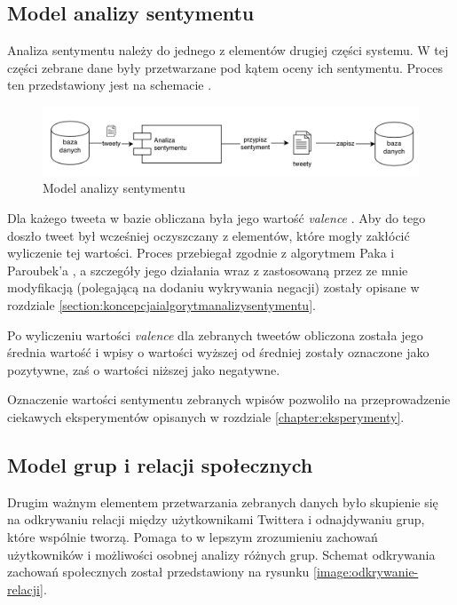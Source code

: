 \subsection{Model analizy sentymentu}
\label{subsection:modelanalizysentymentu}

Analiza sentymentu należy do jednego z elementów drugiej części systemu.
W tej części zebrane dane były przetwarzane pod kątem
oceny ich sentymentu. Proces ten przedstawiony jest na schemacie
.

\begin{figure}[ht!]
\centering
\includegraphics[width=160mm]{img/model-analizy-sentymentu.png}
\caption{Model analizy sentymentu}
\label{image:model-analizy-sentymentu}
\end{figure}


Dla każego tweeta w bazie obliczana była jego wartość \textit{valence}
.
Aby do tego doszło tweet był wcześniej oczyszczany z elementów, które mogły
zakłócić wyliczenie tej wartości. Proces przebiegał zgodnie z algorytmem Paka i
Paroubek'a , a szczegóły jego działania wraz
z zastosowaną przez ze mnie modyfikacją (polegającą na dodaniu wykrywania
negacji) zostały opisane w rozdziale
\ref{section:koncepcjaialgorytmanalizysentymentu}.

Po wyliczeniu wartości \textit{valence} dla zebranych tweetów obliczona została
jego średnia wartość i wpisy o wartości wyższej od średniej zostały oznaczone
jako pozytywne, zaś o wartości niższej jako negatywne.

Oznaczenie wartości sentymentu zebranych wpisów pozwoliło na przeprowadzenie
ciekawych eksperymentów opisanych w rozdziale \ref{chapter:eksperymenty}.


\subsection{Model grup i relacji społecznych}
\label{subsection:modelgrupirelacjispolecznych}
Drugim ważnym elementem przetwarzania zebranych danych było skupienie się na
odkrywaniu relacji między użytkownikami Twittera i odnajdywaniu grup, które
wspólnie tworzą. Pomaga to w lepszym zrozumieniu zachowań użytkowników i
możliwości osobnej analizy różnych grup. Schemat odkrywania zachowań społecznych
został przedstawiony na rysunku \ref{image:odkrywanie-relacji}.


